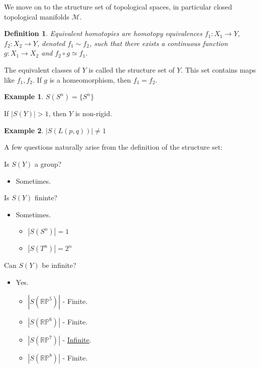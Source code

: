 \documentclass[oneside]{book}
\theoremstyle{mystyle}
\newtheorem{definition}{Definition}[section]
\newtheorem{example}{Example}[section]
\begin{document}
We move on to the structure set of topological spaces, in particular closed topological manifolds $\mathcal{M}$.
\begin{definition}
Equivalent homotopies are homotopy equivalences $f_{1}:X_{1}\rightarrow Y$, $f_{2}:X_{2}\rightarrow Y$, denoted $f_{1}\sim f_{2}$, such that there exists a continuous function $g:X_{1}\rightarrow X_{2}$ and $f_{2}\circ g \simeq f_{1}$.
\end{definition}
The equivalent classes of $Y$ is called the structure set of $Y$. This set contains maps like $f_{1},f_{2}$. If $g$ is a homeomorphism, then $f_{1} = f_{2}$.
\begin{example}
$S(S^{n}) = \{S^{n}\}$
\end{example}
If $|S(Y)|>1$, then $Y$ is non-rigid.
\begin{example}
$|S(L(p,q))| \ne 1$
\end{example}
A few questions naturally arise from the definition of the structure set:
\begin{enumerate}
\begin{multicols}{2}
    \item Is $S(Y)$ a group?
    \begin{itemize}
        \item Sometimes.
    \end{itemize}
    \item Is $S(Y)$ fininte?
    \begin{itemize}
        \item Sometimes.
        \begin{itemize}
            \item $|S(S^{n})| = 1$
            \item $|S(T^{n})| = 2^{n}$
        \end{itemize}
    \end{itemize}
    \item Can $S(Y)$ be infinite?
    \begin{itemize}
        \item Yes.
        \begin{itemize}
            \item $|S(\mathbb{RP}^{5})|$ - Finite.
            \item $|S(\mathbb{RP}^{6})|$ - Finite.
            \item $|S(\mathbb{RP}^{7})|$ - \underline{Infinite}.
            \item $|S(\mathbb{RP}^{8})|$ - Finite.
        \end{itemize}
    \end{itemize}
\end{multicols}
\end{enumerate}
\end{document}
